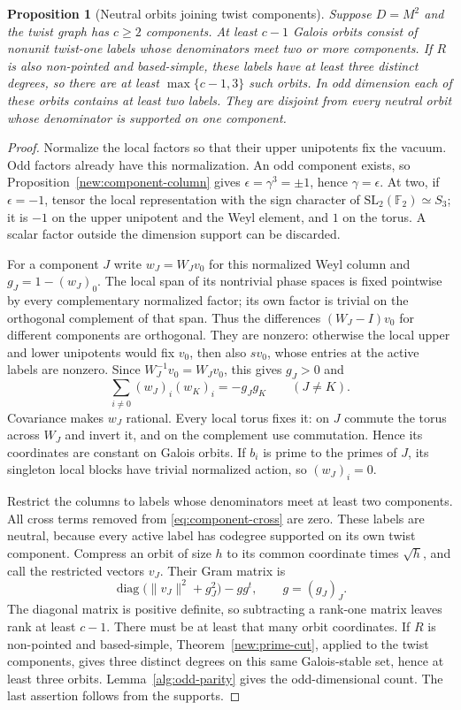 \documentclass[11pt]{amsart}
\numberwithin{equation}{section}
\newtheorem{proposition}[theorem]{Proposition}
\theoremstyle{definition}
\theoremstyle{plain}
\begin{document}
\begin{proposition}[Neutral orbits joining twist components]\label{new:mixed-neutral-rank}\label{odd:neutral-orbits}
Suppose $D=M^2$ and the twist graph has $c\ge2$ components.
At least $c-1$ Galois orbits consist of nonunit twist-one labels
whose denominators meet two or more components. If $R$ is also
non-pointed and based-simple, these labels have at least three
distinct degrees, so there are at least $\max\{c-1,3\}$ such orbits.
In odd dimension each of these orbits contains at least two labels.
They are disjoint from every neutral orbit whose denominator is
supported on one component.
\end{proposition}
\begin{proof}
Normalize the local factors so that their upper unipotents fix the
vacuum. Odd factors already have this normalization. An odd
component exists, so Proposition~\ref{new:component-column} gives
$\epsilon=\gamma^3=\pm1$, hence $\gamma=\epsilon$. At two, if
$\epsilon=-1$, tensor the local representation with the sign
character of $\mathrm{SL}_2(\mathbb F_2)\simeq S_3$; it is $-1$
on the upper unipotent and the Weyl element, and $1$ on the torus.
A scalar factor outside the dimension support can be discarded.

For a component $J$ write $w_J=W_Jv_0$ for this normalized Weyl
column and $g_J=1-(w_J)_0$. The local span of its nontrivial phase
spaces is fixed pointwise by every complementary normalized factor;
its own factor is trivial on the orthogonal complement of that span.
Thus the differences $(W_J-I)v_0$ for different components are
orthogonal. They are nonzero: otherwise the local upper and lower
unipotents would fix $v_0$, then also $sv_0$, whose entries at the
active labels are nonzero. Since $W_J^{-1}v_0=W_Jv_0$, this gives
$g_J>0$ and
\begin{equation}\label{eq:component-cross}
 \sum_{i\ne0}(w_J)_i(w_K)_i=-g_Jg_K\qquad(J\ne K).
\end{equation}
Covariance makes $w_J$ rational. Every local torus fixes it:
on $J$ commute the torus across $W_J$ and invert it, and on the
complement use commutation. Hence its coordinates are constant on
Galois orbits. If $b_i$ is prime to the primes of $J$, its singleton
local blocks have trivial normalized action, so $(w_J)_i=0$.

Restrict the columns to labels whose denominators meet at least two
components. All cross terms removed from
\eqref{eq:component-cross} are zero. These labels are neutral,
because every active label has codegree supported on its own twist
component. Compress an orbit of size $h$ to its common coordinate
times $\sqrt h$, and call the restricted vectors $v_J$. Their Gram
matrix is
\[
 \operatorname{diag}\bigl(\|v_J\|^2+g_J^2\bigr)-gg^t,
 \qquad g=(g_J)_J.
\]
The diagonal matrix is positive definite, so subtracting a rank-one
matrix leaves rank at least $c-1$. There must be at least that many
orbit coordinates. If $R$ is non-pointed and based-simple,
Theorem~\ref{new:prime-cut}, applied to the twist components, gives
three distinct degrees on this same Galois-stable set, hence at
least three orbits. Lemma~\ref{alg:odd-parity} gives the
odd-dimensional count. The last assertion follows from the supports.
\end{proof}
\end{document}
